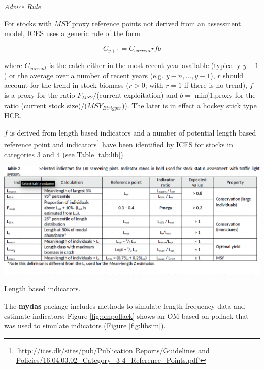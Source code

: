 \textit{Advice Rule}

For stocks with $MSY$ proxy reference points not derived from an assessment model, ICES uses a generic rule of the form 
 
\begin{equation}C_{y+1}=C_{current}rfb\end{equation}

where $C_{current}$ is the catch either in the most recent year available (typically $y-1$) or the average over a number of recent years (e.g. $y-n, ... ,y-1$), $r$ should account for the trend in stock biomass ($r>0$; with $r=1$ if there is no trend), $f$  is a proxy for the ratio $F_{MSY}/$(current exploitation) and $b=$ min(1,proxy for the ratio (current stock size)/($MSY_{Btrigger}$)). The later is in effect a hockey stick type HCR. 

$f$ is derived from length based indicators and a number of potential length based reference point and indicators\footnote{\url{'http://ices.dk/sites/pub/Publication Reports/Guidelines and Policies/16.04.03.02_Category_3-4_Reference_Points.pdf'}} have been identified by ICES for stocks in categories 3 and 4 (see Table \ref{tab:lib}) 

\begin{table}[h!]\centering
\includegraphics[width=\textwidth]{figs/lib.png}
\caption{Length based indicators.}
\label{tab:lib}
\end{table}

The \textbf{mydas} package includes methods to simulate length frequency data and estimate indicators; Figure \ref{fig:ompollack} shows an OM based on pollack that was used to simulate indicators (Figure \ref{fig:libsim}).

